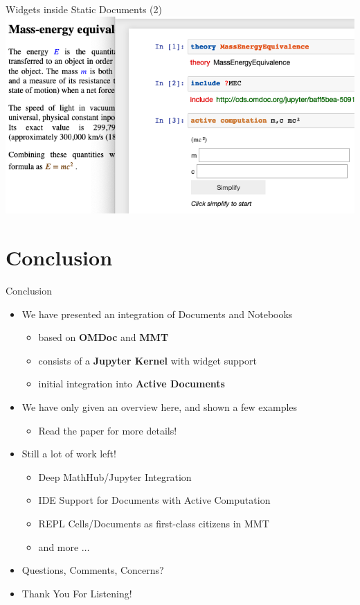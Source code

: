 \documentclass{beamer}
\begin{document}
    \begin{frame}[fragile]{Widgets inside Static Documents (2)}
        \includegraphics[scale=0.5]{images/acwidget}
    \end{frame}


    \section{Conclusion}

    \begin{frame}{Conclusion}
        \begin{itemize}
            \item We have presented an integration of Documents and Notebooks
            \begin{itemize}
                \item based on \textbf{OMDoc} and \textbf{MMT}
                \item consists of a \textbf{Jupyter Kernel} with widget support
                \item initial integration into \textbf{Active Documents}
            \end{itemize}

            \item We have only given an overview here, and shown a few examples
            \begin{itemize}
                \item Read the paper for more details!
            \end{itemize}

            \item Still a lot of work left!
            \begin{itemize}
                \item Deep MathHub/Jupyter Integration
                \item IDE Support for Documents with Active Computation
                \item REPL Cells/Documents as first-class citizens in MMT
                \item and more $\dots$
            \end{itemize}

            \item Questions, Comments, Concerns?

            \item Thank You For Listening!

        \end{itemize}
    \end{frame}
\end{document}
